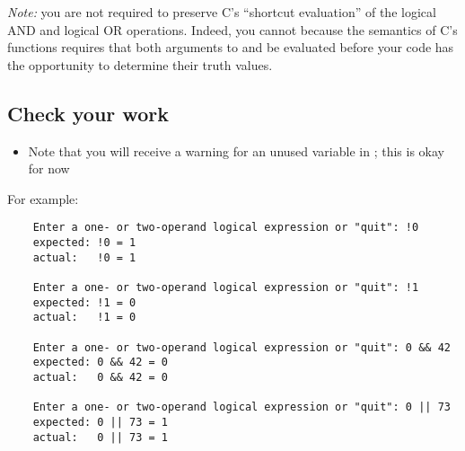 \textit{Note:} you are not required to preserve C's ``shortcut evaluation'' of the logical AND and logical OR operations.
Indeed, you cannot because the semantics of C's functions requires that both arguments to  and  be evaluated before your code has the opportunity to determine their truth values.

\subsection*{Check your work}

\begin{description}
    \begin{itemize}
        \item Note that you will receive a warning for an unused variable in ;
            this is okay for now
    \end{itemize}
\end{description}
For example:
\begin{verbatim}
    Enter a one- or two-operand logical expression or "quit": !0
    expected: !0 = 1
    actual:   !0 = 1

    Enter a one- or two-operand logical expression or "quit": !1
    expected: !1 = 0
    actual:   !1 = 0

    Enter a one- or two-operand logical expression or "quit": 0 && 42
    expected: 0 && 42 = 0
    actual:   0 && 42 = 0

    Enter a one- or two-operand logical expression or "quit": 0 || 73
    expected: 0 || 73 = 1
    actual:   0 || 73 = 1
\end{verbatim}

\begin{description}
\end{description}
